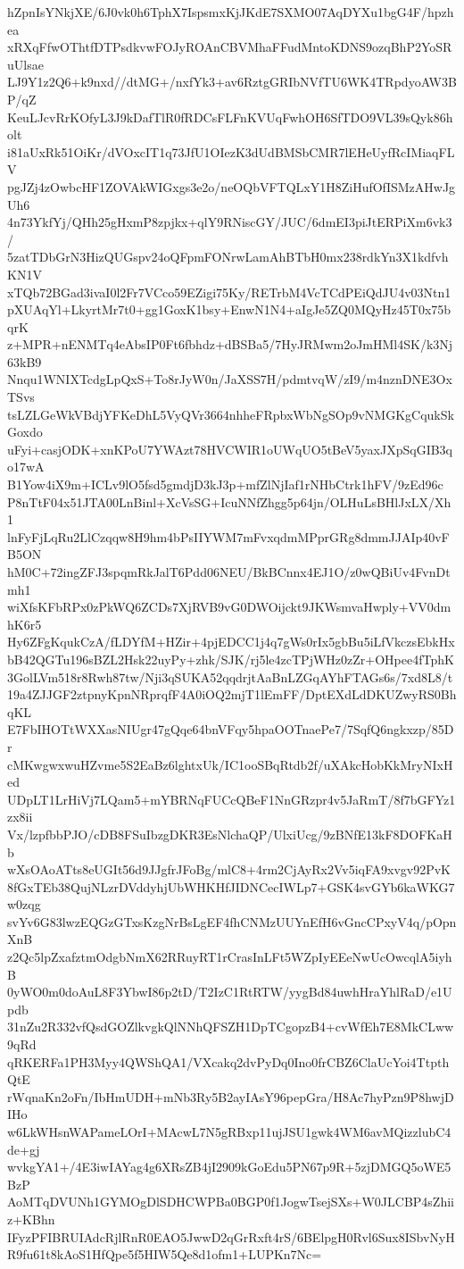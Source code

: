 hZpnIsYNkjXE/6J0vk0h6TphX7IspsmxKjJKdE7SXMO07AqDYXu1bgG4F/hpzhea
xRXqFfwOThtfDTPsdkvwFOJyROAnCBVMhaFFudMntoKDNS9ozqBhP2YoSRuUlsae
LJ9Y1z2Q6+k9nxd//dtMG+/nxfYk3+av6RztgGRIbNVfTU6WK4TRpdyoAW3BP/qZ
KeuLJcvRrKOfyL3J9kDafTlR0fRDCsFLFnKVUqFwhOH6SfTDO9VL39sQyk86holt
i81aUxRk51OiKr/dVOxcIT1q73JfU1OIezK3dUdBMSbCMR7lEHeUyfRcIMiaqFLV
pgJZj4zOwbcHF1ZOVAkWIGxgs3e2o/neOQbVFTQLxY1H8ZiHufOfISMzAHwJgUh6
4n73YkfYj/QHh25gHxmP8zpjkx+qlY9RNiscGY/JUC/6dmEI3piJtERPiXm6vk3/
5zatTDbGrN3HizQUGspv24oQFpmFONrwLamAhBTbH0mx238rdkYn3X1kdfvhKN1V
xTQb72BGad3ivaI0l2Fr7VCco59EZigi75Ky/RETrbM4VcTCdPEiQdJU4v03Ntn1
pXUAqYl+LkyrtMr7t0+gg1GoxK1bsy+EnwN1N4+aIgJe5ZQ0MQyHz45T0x75bqrK
z+MPR+nENMTq4eAbsIP0Ft6fbhdz+dBSBa5/7HyJRMwm2oJmHMl4SK/k3Nj63kB9
Nnqu1WNIXTcdgLpQxS+To8rJyW0n/JaXSS7H/pdmtvqW/zI9/m4nznDNE3OxTSvs
tsLZLGeWkVBdjYFKeDhL5VyQVr3664nhheFRpbxWbNgSOp9vNMGKgCqukSkGoxdo
uFyi+casjODK+xnKPoU7YWAzt78HVCWIR1oUWqUO5tBeV5yaxJXpSqGIB3qo17wA
B1Yow4iX9m+ICLv9lO5fsd5gmdjD3kJ3p+mfZlNjIaf1rNHbCtrk1hFV/9zEd96c
P8nTtF04x51JTA00LnBinl+XcVsSG+IcuNNfZhgg5p64jn/OLHuLsBHlJxLX/Xh1
lnFyFjLqRu2LlCzqqw8H9hm4bPsIIYWM7mFvxqdmMPprGRg8dmmJJAIp40vFB5ON
hM0C+72ingZFJ3spqmRkJalT6Pdd06NEU/BkBCnnx4EJ1O/z0wQBiUv4FvnDtmh1
wiXfsKFbRPx0zPkWQ6ZCDs7XjRVB9vG0DWOijckt9JKWsmvaHwply+VV0dmhK6r5
Hy6ZFgKqukCzA/fLDYfM+HZir+4pjEDCC1j4q7gWs0rIx5gbBu5iLfVkczsEbkHx
bB42QGTu196sBZL2Hsk22uyPy+zhk/SJK/rj5le4zcTPjWHz0zZr+OHpee4fTphK
3GolLVm518r8Rwh87tw/Nji3qSUKA52qqdrjtAaBnLZGqAYhFTAGs6s/7xd8L8/t
19a4ZJJGF2ztpnyKpnNRprqfF4A0iOQ2mjT1lEmFF/DptEXdLdDKUZwyRS0BhqKL
E7FbIHOTtWXXasNIUgr47gQqe64bnVFqy5hpaOOTnaePe7/7SqfQ6ngkxzp/85Dr
cMKwgwxwuHZvme5S2EaBz6lghtxUk/IC1ooSBqRtdb2f/uXAkcHobKkMryNIxHed
UDpLT1LrHiVj7LQam5+mYBRNqFUCcQBeF1NnGRzpr4v5JaRmT/8f7bGFYz1zx8ii
Vx/lzpfbbPJO/cDB8FSuIbzgDKR3EsNlchaQP/UlxiUcg/9zBNfE13kF8DOFKaHb
wXsOAoATts8eUGIt56d9JJgfrJFoBg/mlC8+4rm2CjAyRx2Vv5iqFA9xvgv92PvK
8fGxTEb38QujNLzrDVddyhjUbWHKHfJIDNCecIWLp7+GSK4svGYb6kaWKG7w0zqg
svYv6G83lwzEQGzGTxsKzgNrBsLgEF4fhCNMzUUYnEfH6vGncCPxyV4q/pOpnXnB
z2Qc5lpZxafztmOdgbNmX62RRuyRT1rCrasInLFt5WZpIyEEeNwUcOwcqlA5iyhB
0yWO0m0doAuL8F3YbwI86p2tD/T2IzC1RtRTW/yygBd84uwhHraYhlRaD/e1Updb
31nZu2R332vfQsdGOZlkvgkQlNNhQFSZH1DpTCgopzB4+cvWfEh7E8MkCLww9qRd
qRKERFa1PH3Myy4QWShQA1/VXcakq2dvPyDq0Ino0frCBZ6ClaUcYoi4TtpthQtE
rWqnaKn2oFn/IbHmUDH+mNb3Ry5B2ayIAsY96pepGra/H8Ac7hyPzn9P8hwjDIHo
w6LkWHsnWAPameLOrI+MAcwL7N5gRBxp11ujJSU1gwk4WM6avMQizzlubC4de+gj
wvkgYA1+/4E3iwIAYag4g6XRsZB4jI2909kGoEdu5PN67p9R+5zjDMGQ5oWE5BzP
AoMTqDVUNh1GYMOgDlSDHCWPBa0BGP0f1JogwTsejSXs+W0JLCBP4sZhiiz+KBhn
IFyzPFIBRUIAdcRjlRnR0EAO5JwwD2qGrRxft4rS/6BElpgH0Rvl6Sux8ISbvNyH
R9fu61t8kAoS1HfQpe5f5HIW5Qe8d1ofm1+LUPKn7Nc=

